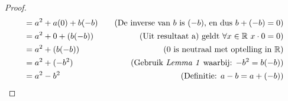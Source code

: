 \documentclass{article}
\newcommand{\tx}[1]{\text{#1}}
\newcommand{\R}{\mathbb{R}}
\begin{document}
\begin{enumerate}[label=\alph*)]
\begin{proof}
\begin{align*}
            &= a^2 + a(0) + b(-b) &\quad (\tx{De inverse van $b$ is $(-b)$, en dus $b + (-b) = 0$}) \\
            &= a^2 + 0 + (b(-b)) &\quad (\tx{Uit resultaat a) geldt }\forall x \in \R \ x\cdot 0 = 0)\\
            &= a^2 + (b(-b)) &\quad (0 \tx{ is neutraal met optelling in }\R)\\
            &= a^2 + (-b^2)  &\quad (\tx{Gebruik \emph{Lemma 1} waarbij: $-b^2 = b(-b)$}) \\
            &= a^2 - b^2 &\quad (\tx{Definitie: $a-b = a + (-b)$})\\
        \end{align*}
        
    \end{proof}
\end{enumerate}
\end{document}

